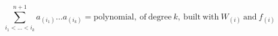 \begin{equation}
\sum_{i_1<...<i_k}^{n+1} a_{(i_1)}...a_{(i_k)} = 
\mathrm{polynomial,~of~degree~}k \mathrm{,~built~with~} W_{(i)} 
\mathrm{~and~} f_{(i)} 
\end{equation} 
